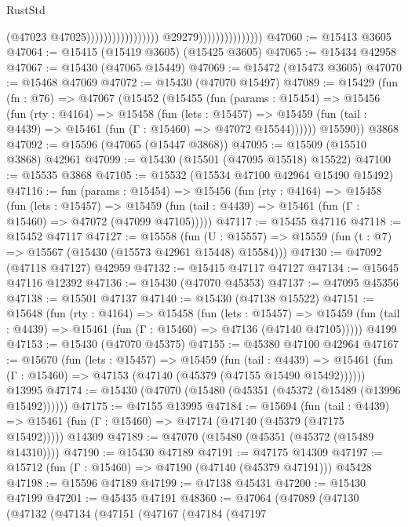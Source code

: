 \begin{lexlean}{RustStd}
\begin{coremodule}
                                                                  (@47023 @47025)))))))))))))))))
                                  @29279)))))))))))))))
@47060 := @15413 @3605
@47064 := @15415 (@15419 @3605) (@15425 @3605)
@47065 := @15434 @42958
@47067 := @15430 (@47065 @15449)
@47069 := @15472 (@15473 @3605)
@47070 := @15468 @47069
@47072 := @15430 (@47070 @15497)
@47089 := @15429
    (fun (fn : @76) =>
    @47067
      (@15452
        (@15455
          (fun (params : @15454) =>
          @15456
            (fun (rty : @4164) =>
            @15458
              (fun (lets : @15457) =>
              @15459 (fun (tail : @4439) => @15461 (fun (Γ : @15460) => @47072 @15544))))))
        @15590))
    @3868
@47092 := @15596 (@47065 (@15447 @3868))
@47095 := @15509 (@15510 @3868) @42961
@47099 := @15430 (@15501 (@47095 @15518) @15522)
@47100 := @15535 @3868
@47105 := @15532 (@15534 @47100 @42964 @15490 @15492)
@47116 := fun (params : @15454) =>
  @15456
    (fun (rty : @4164) =>
    @15458
      (fun (lets : @15457) =>
      @15459 (fun (tail : @4439) => @15461 (fun (Γ : @15460) => @47072 (@47099 @47105)))))
@47117 := @15455 @47116
@47118 := @15452 @47117
@47127 := @15558
    (fun (U : @15557) => @15559 (fun (t : @7) => @15567 (@15430 (@15573 @42961 @15448) @15584)))
@47130 := @47092 (@47118 @47127) @42959
@47132 := @15415 @47117 @47127
@47134 := @15645 @47116 @12392
@47136 := @15430 (@47070 @45353)
@47137 := @47095 @45356
@47138 := @15501 @47137
@47140 := @15430 (@47138 @15522)
@47151 := @15648
    (fun (rty : @4164) =>
    @15458
      (fun (lets : @15457) =>
      @15459 (fun (tail : @4439) => @15461 (fun (Γ : @15460) => @47136 (@47140 @47105)))))
    @4199
@47153 := @15430 (@47070 @45375)
@47155 := @45380 @47100 @42964
@47167 := @15670
    (fun (lets : @15457) =>
    @15459
      (fun (tail : @4439) =>
      @15461 (fun (Γ : @15460) => @47153 (@47140 (@45379 (@47155 @15490 @15492))))))
    @13995
@47174 := @15430 (@47070 (@15480 (@45351 (@45372 (@15489 (@13996 @15492))))))
@47175 := @47155 @13995
@47184 := @15694
    (fun (tail : @4439) => @15461 (fun (Γ : @15460) => @47174 (@47140 (@45379 (@47175 @15492)))))
    @14309
@47189 := @47070 (@15480 (@45351 (@45372 (@15489 @14310))))
@47190 := @15430 @47189
@47191 := @47175 @14309
@47197 := @15712 (fun (Γ : @15460) => @47190 (@47140 (@45379 @47191))) @45428
@47198 := @15596 @47189
@47199 := @47138 @45431
@47200 := @15430 @47199
@47201 := @45435 @47191
@48360 := @47064
    (@47089
      (@47130
        (@47132
          (@47134
            (@47151
              (@47167
                (@47184
                  (@47197

\end{coremodule}
\end{lexlean}
